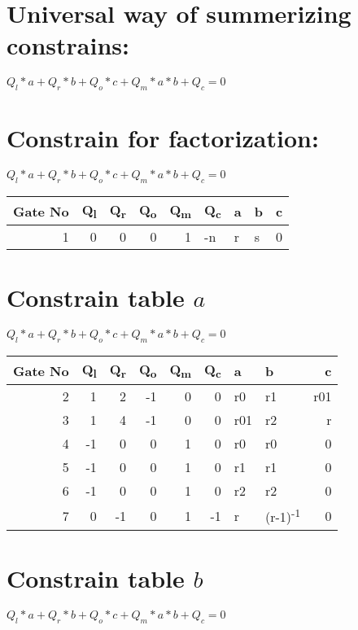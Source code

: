 \documentclass[11pt]{article}
\begin{document}
\section{Universal way of summerizing constrains:}
\label{sec:org9c3240b}
\(Q_l*a + Q_r*b + Q_o*c + Q_m*a*b + Q_c = 0\)

\section{Constrain for factorization:}
\label{sec:orgea626c6}
\(Q_l*a + Q_r*b + Q_o*c + Q_m*a*b + Q_c = 0\)

\begin{center}
\begin{tabular}{rrrrrlllr}
Gate No & Q\textsubscript{l} & Q\textsubscript{r} & Q\textsubscript{o} & Q\textsubscript{m} & Q\textsubscript{c} & a & b & c\\[0pt]
\hline
1 & 0 & 0 & 0 & 1 & -n & r & s & 0\\[0pt]
\end{tabular}
\end{center}

\section{Constrain table \(a\)}
\label{sec:orgfa4de93}
\(Q_l*a + Q_r*b + Q_o*c + Q_m*a*b + Q_c = 0\)

\begin{center}
\begin{tabular}{rrrrrrllr}
Gate No & Q\textsubscript{l} & Q\textsubscript{r} & Q\textsubscript{o} & Q\textsubscript{m} & Q\textsubscript{c} & a & b & c\\[0pt]
\hline
2 & 1 & 2 & -1 & 0 & 0 & r0 & r1 & r01\\[0pt]
3 & 1 & 4 & -1 & 0 & 0 & r01 & r2 & r\\[0pt]
4 & -1 & 0 & 0 & 1 & 0 & r0 & r0 & 0\\[0pt]
5 & -1 & 0 & 0 & 1 & 0 & r1 & r1 & 0\\[0pt]
6 & -1 & 0 & 0 & 1 & 0 & r2 & r2 & 0\\[0pt]
7 & 0 & -1 & 0 & 1 & -1 & r & (r-1)\textsuperscript{-1} & 0\\[0pt]
\hline
\end{tabular}
\end{center}

\section{Constrain table  \(b\)}
\label{sec:orgcce3822}
\(Q_l*a + Q_r*b + Q_o*c + Q_m*a*b + Q_c = 0\)
\end{document}

